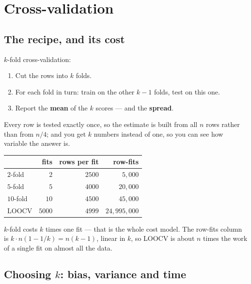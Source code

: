 \documentclass[11pt]{article}
\begin{document}
\section{Cross-validation}
\label{sec:cv}

\subsection{The recipe, and its cost}

$k$-fold cross-validation:

\begin{enumerate}[leftmargin=*]
  \item Cut the rows into $k$ folds.
  \item For each fold in turn: train on the other $k-1$ folds, test on this
    one.
  \item Report the \textbf{mean} of the $k$ scores --- and the \textbf{spread}.
\end{enumerate}

Every row is tested exactly once, so the estimate is built from all $n$ rows
rather than from $n/4$; and you get $k$ numbers instead of one, so you can see
how variable the answer is.

\begin{worked}[The cost model, on $n = 5000$ rows]
\begin{center}\small
\begin{tabular}{@{}lrrr@{}}
  \toprule
  & fits & rows per fit & row-fits\\
  \midrule
  $2$-fold  & $2$ & $2500$ & $5{,}000$\\
  $5$-fold  & $5$ & $4000$ & $20{,}000$\\
  $10$-fold & $10$ & $4500$ & $45{,}000$\\
  LOOCV     & $5000$ & $4999$ & $24{,}995{,}000$\\
  \bottomrule
\end{tabular}
\end{center}
$k$-fold costs $k$ times one fit --- that is the whole cost model. The
row-fits column is $k \cdot n(1 - 1/k) = n(k-1)$, linear in $k$, so LOOCV is
about $n$ times the work of a single fit on almost all the data.
\end{worked}

\subsection{Choosing $k$: bias, variance and time}
\label{sec:kchoice}
\end{document}
